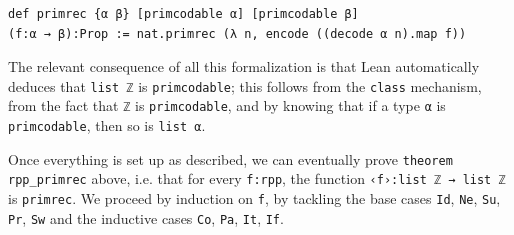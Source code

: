 \documentclass[preprint]{elsarticle}
\theoremstyle{remark}
\newcommand{\MATHLIB}{\textsf{mathlib}\xspace}
\newcommand{\LEAN}{\textsf{Lean}\xspace}
\begin{document}
\begin{lstlisting}
def primrec {α β} [primcodable α] [primcodable β]
(f:α → β):Prop := nat.primrec (λ n, encode ((decode α n).map f))
\end{lstlisting}

The relevant consequence of all this formalization is that \LEAN automatically deduces that \lstinline|list ℤ| is \lstinline|primcodable|; this follows from the \lstinline|class| mechanism, from the fact that \lstinline|ℤ| is \lstinline|primcodable|, and by knowing that if a type \lstinline|α| is \lstinline|primcodable|, then so is \lstinline|list α|.

\vspace{\baselineskip}
Once everything is set up as described, we can eventually prove \lstinline|theorem rpp_primrec| above, i.e.\@
that for every \lstinline|f:rpp|, the function \lstinline|‹f›:list ℤ → list ℤ| is \lstinline|primrec|. We proceed by induction on \lstinline|f|, by tackling the base cases \lstinline|Id|, \lstinline|Ne|, \lstinline|Su|, \lstinline|Pr|, \lstinline|Sw| and the inductive cases \lstinline|Co|, \lstinline|Pa|, \lstinline|It|, \lstinline|If|.


\end{document}
